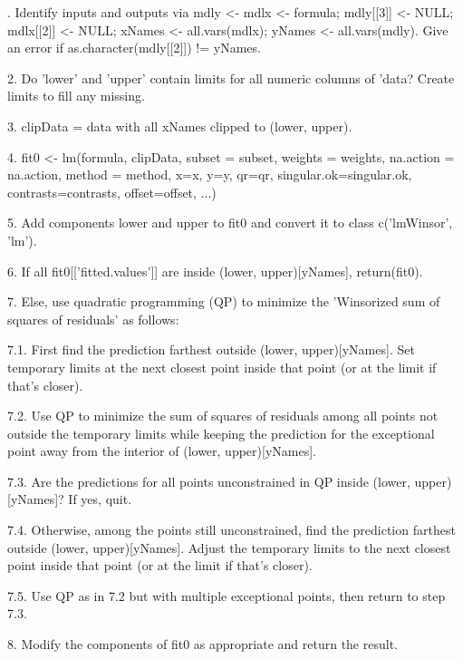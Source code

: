 \begin{Details}.  Identify inputs and outputs via mdly <- mdlx <- formula;
mdly[[3]] <- NULL;  mdlx[[2]] <- NULL;  xNames <- all.vars(mdlx); 
yNames <- all.vars(mdly).  Give an error if as.character(mdly[[2]]) !=
yNames.  

2.  Do 'lower' and 'upper' contain limits for all numeric columns of
'data?  Create limits to fill any missing.   

3.  clipData = data with all xNames clipped to (lower, upper).

4.  fit0 <- lm(formula, clipData, subset = subset, weights = weights,
na.action = na.action, method = method, x=x, y=y, qr=qr,
singular.ok=singular.ok, contrasts=contrasts, offset=offset, ...)

5.  Add components lower and upper to fit0 and convert it to class
c('lmWinsor', 'lm').  

6.  If all fit0[['fitted.values']] are inside (lower, upper)[yNames], 
return(fit0).

7.  Else, use quadratic programming (QP) to minimize the 'Winsorized
sum of squares of residuals' as follows:

7.1.  First find the prediction farthest outside (lower,
upper)[yNames].  Set temporary limits at the next closest point inside
that point (or at the limit if that's closer).  

7.2.  Use QP to minimize the sum of squares of residuals among all
points not outside the temporary limits while keeping the prediction
for the exceptional point away from the interior of (lower,
upper)[yNames].

7.3.  Are the predictions for all points unconstrained in QP inside
(lower, upper)[yNames]?  If yes, quit.    

7.4.  Otherwise, among the points still unconstrained, find the
prediction farthest outside (lower, upper)[yNames].  Adjust the
temporary limits to the next closest point inside that point (or at
the limit if that's closer).

7.5.  Use QP as in 7.2 but with multiple exceptional points, then
return to step 7.3.  

8.  Modify the components of fit0 as appropriate and return the
result.
\end{Details}
